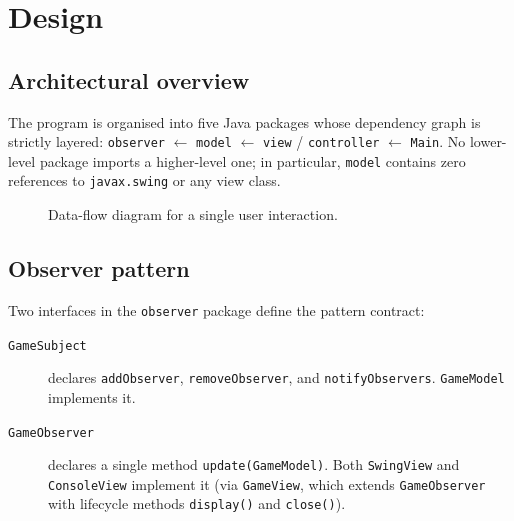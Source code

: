\documentclass[12pt,a4paper]{article}
\begin{document}
\section{Design}
\label{sec:design}

\subsection{Architectural overview}

The program is organised into five Java packages whose dependency graph is
strictly layered: \texttt{observer} $\leftarrow$ \texttt{model} $\leftarrow$
\texttt{view} / \texttt{controller} $\leftarrow$ \texttt{Main}.
No lower-level package imports a higher-level one; in particular, \texttt{model}
contains zero references to \texttt{javax.swing} or any view class.

\begin{figure}[ht]
\centering
{}
\caption{Data-flow diagram for a single user interaction.}
\label{fig:dataflow}
\end{figure}

\subsection{Observer pattern}

Two interfaces in the \texttt{observer} package define the pattern contract:

\begin{description}
  \item[\texttt{GameSubject}] declares \texttt{addObserver},
        \texttt{removeObserver}, and \texttt{notifyObservers}.
        \texttt{GameModel} implements it.
  \item[\texttt{GameObserver}] declares a single method \texttt{update(GameModel)}.
        Both \texttt{SwingView} and \texttt{ConsoleView} implement it (via
        \texttt{GameView}, which extends \texttt{GameObserver} with lifecycle
        methods \texttt{display()} and \texttt{close()}).
\end{description}
\end{document}
